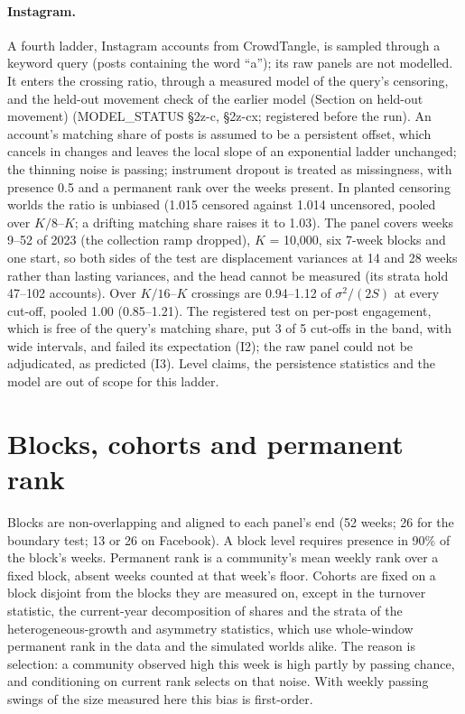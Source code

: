 \documentclass[10pt]{article}
\begin{document}
\paragraph{Instagram.} A fourth ladder, Instagram accounts from CrowdTangle, is sampled through a keyword query (posts containing the word ``a''); its raw panels are not modelled. It enters the crossing ratio, through a measured model of the query's censoring, and the held-out movement check of the earlier model (Section on held-out movement) (MODEL\_STATUS \S2z-c, \S2z-cx; registered before the run). An account's matching share of posts is assumed to be a persistent offset, which cancels in changes and leaves the local slope of an exponential ladder unchanged; the thinning noise is passing; instrument dropout is treated as missingness, with presence 0.5 and a permanent rank over the weeks present. In planted censoring worlds the ratio is unbiased (1.015 censored against 1.014 uncensored, pooled over $K/8$--$K$; a drifting matching share raises it to 1.03). The panel covers weeks 9--52 of 2023 (the collection ramp dropped), $K$ = 10,000, six 7-week blocks and one start, so both sides of the test are displacement variances at 14 and 28 weeks rather than lasting variances, and the head cannot be measured (its strata hold 47--102 accounts). Over $K/16$--$K$ crossings are 0.94--1.12 of $\sigma^2/(2S)$ at every cut-off, pooled 1.00 (0.85--1.21). The registered test on per-post engagement, which is free of the query's matching share, put 3 of 5 cut-offs in the band, with wide intervals, and failed its expectation (I2); the raw panel could not be adjudicated, as predicted (I3). Level claims, the persistence statistics and the model are out of scope for this ladder.

\section{Blocks, cohorts and permanent rank}
Blocks are non-overlapping and aligned to each panel's end (52 weeks; 26 for the boundary test; 13 or 26 on Facebook). A block level requires presence in 90\% of the block's weeks. Permanent rank is a community's mean weekly rank over a fixed block, absent weeks counted at that week's floor. Cohorts are fixed on a block disjoint from the blocks they are measured on, except in the turnover statistic, the current-year decomposition of shares and the strata of the heterogeneous-growth and asymmetry statistics, which use whole-window permanent rank in the data and the simulated worlds alike. The reason is selection: a community observed high this week is high partly by passing chance, and conditioning on current rank selects on that noise. With weekly passing swings of the size measured here this bias is first-order.
\end{document}
